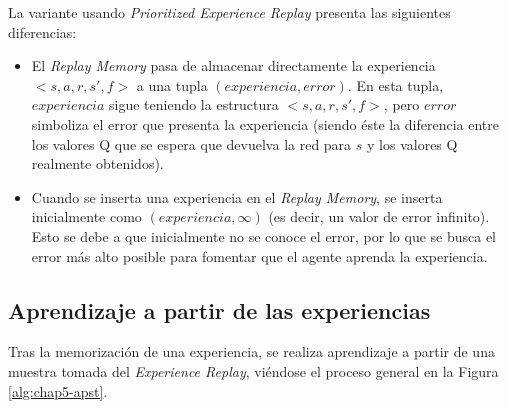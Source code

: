 La variante usando \textit{Prioritized Experience Replay} presenta las siguientes diferencias:
\begin{itemize}
\item El \textit{Replay Memory} pasa de almacenar directamente la experiencia $<s, a, r, s', f>$ a una tupla $(experiencia, error)$. En esta tupla, $experiencia$ sigue teniendo la estructura $<s, a, r, s', f>$, pero $error$ simboliza el error que presenta la experiencia (siendo éste la diferencia entre los valores Q que se espera que devuelva la red para $s$ y los valores Q realmente obtenidos).
\item Cuando se inserta una experiencia en el \textit{Replay Memory}, se inserta inicialmente como $(experiencia, \infty)$ (es decir, un valor de error infinito). Esto se debe a que inicialmente no se conoce el error, por lo que se busca el error más alto posible para fomentar que el agente aprenda la experiencia.
\end{itemize}

\subsection{Aprendizaje a partir de las experiencias}

Tras la memorización de una experiencia, se realiza aprendizaje a partir de una muestra tomada del \textit{Experience Replay}, viéndose el proceso general en la Figura \ref{alg:chap5-apst}.

